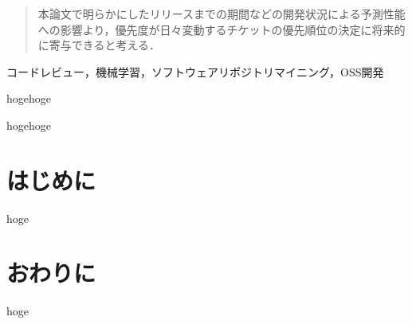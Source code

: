 \documentclass[submit]{ipsj}
\begin{document}
\begin{abstract}
本論文で明らかにしたリリースまでの期間などの開発状況による予測性能への影響より，優先度が日々変動するチケットの優先順位の決定に将来的に寄与できると考える．
\end{abstract}


\begin{jkeyword}
コードレビュー，機械学習，ソフトウェアリポジトリマイニング，OSS開発
\end{jkeyword}

\begin{eabstract}
hogehoge
\end{eabstract}

\begin{ekeyword}
hogehoge
\end{ekeyword}

\maketitle

\section{はじめに}

hoge

\section{おわりに}
\label{sec:conclusion}

hoge





\vspace{-4mm}

\begin{biography}
%
\end{biography}
\end{document}
